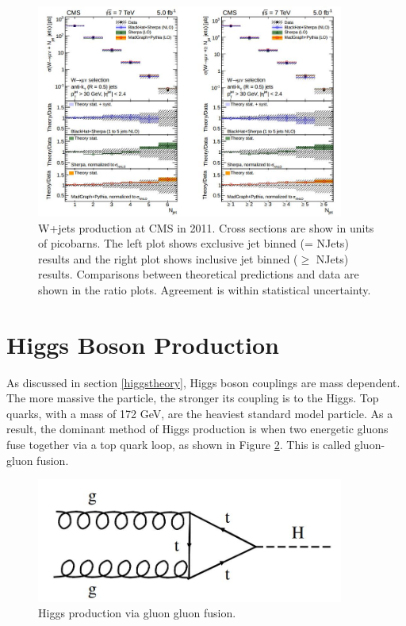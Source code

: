 \documentclass[oneside, letterpaper, oldfontcommands]{memoir}
\begin{document}
\begin{figure}[here]
\includegraphics[width=0.9\textwidth]{wjets7TeV.jpg}
\caption{W+jets production at CMS in 2011. Cross sections are show in units of picobarns. The left plot shows exclusive jet binned (= NJets) results and the right plot shows inclusive jet binned ($\geq$ NJets) results. Comparisons between theoretical predictions and data are shown in the ratio plots. Agreement is within statistical uncertainty. }
\label{fig:wjets7TeV}
\end{figure}


\section{Higgs Boson Production}\label{higgspheno}
\qquad As discussed in section \ref{higgstheory}, Higgs boson couplings are mass dependent. The more massive the particle, the stronger its coupling is to the Higgs. Top quarks, with a mass of 172 GeV, are the heaviest standard model particle. As a result, the dominant method of Higgs production is when two energetic gluons fuse together via a top quark loop, as shown in Figure \ref{fig:ggfHiggs}. This is called gluon-gluon fusion.

\begin{figure}[here]
\includegraphics[width=0.9\textwidth]{ggfHiggs.jpg}
\caption{Higgs production via gluon gluon fusion.}
\label{fig:ggfHiggs}
\end{figure}
\end{document}
